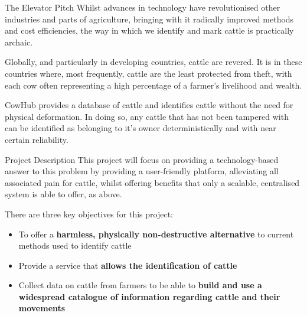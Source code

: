 

\begin{subsection}{The Elevator Pitch}
  Whilst advances in technology have revolutionised other industries and parts of agriculture, bringing with it radically improved methods and cost efficiencies, the way in which we identify and mark cattle is practically archaic.
  
  Globally, and particularly in developing countries, cattle are revered. It is in these countries where, most frequently, cattle are the least protected from theft, with each cow often representing a high percentage of a farmer's livelihood and wealth.
  
  CowHub provides a database of cattle and identifies cattle without the need for physical deformation. In doing so, any cattle that has not been tampered with can be identified as belonging to it's owner deterministically and with near certain reliability.
\end{subsection}
 

\begin{subsection}{Project Description}
  This project will focus on providing a technology-based answer to this problem by providing a user-friendly platform, alleviating all associated pain for cattle, whilst offering benefits that only a scalable, centralised system is able to offer, as above.
    
  There are three key objectives for this project:
  
  \begin{itemize}
  	\item To offer a \textbf{harmless, physically non-destructive alternative} to current methods used to identify cattle
  	\item Provide a service that \textbf{allows the identification of cattle}
  	\item Collect data on cattle from farmers to be able to \textbf{build and use a widespread catalogue of information regarding cattle and their movements}
  \end{itemize}
\end{subsection}

